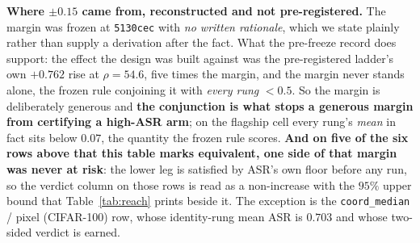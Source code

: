 \documentclass{article}
\begin{document}
\textbf{Where $\pm0.15$ came from, reconstructed and not pre-registered.} The margin was frozen at \texttt{5130cec} with \emph{no written rationale}, which we state plainly rather than supply a derivation after the fact. What the pre-freeze record does support: the effect the design was built against was the pre-registered ladder's own $+0.762$ rise at $\rho{=}54.6$, five times the margin, and the margin never stands alone, the frozen rule conjoining it with \emph{every rung} $<0.5$. So the margin is deliberately generous and \textbf{the conjunction is what stops a generous margin from certifying a high-ASR arm}; on the flagship cell every rung's \emph{mean} in fact sits below $0.07$, the quantity the frozen rule scores.
\textbf{And on five of the six rows above that this table marks equivalent, one side of that margin was
never at risk}: the lower leg is
satisfied by ASR's own floor before any run, so the verdict column on those rows is read as a non-increase
with the $95\%$ upper bound that Table~\ref{tab:reach} prints beside it. The exception is the
\texttt{coord\_median} / pixel (CIFAR-100) row, whose identity-rung mean ASR is $0.703$ and whose two-sided
verdict is earned.
\end{document}
